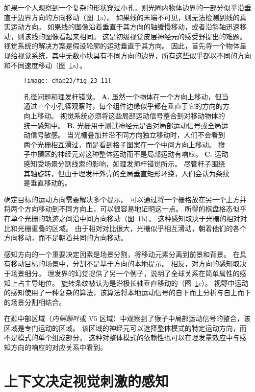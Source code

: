 如果一个人观察到一个复杂的形状穿过小孔，则光圈内物体边界的一部分似乎沿垂直于边界方向的方向移动（图~\ref{fig:23_11}a）。 
如果线的末端不可见，则无法检测到线的真实运动方向。 
如果线的图像沿着垂直于其方向的轴缓慢移动，或者沿斜轴迅速移动，则该线的图像看起来相同。
这是初级视觉皮层神经元的感受野提出的难题。 
视觉系统的解决方案是假设轮廓的运动垂直于其方向。 
因此，首先将一个物体呈现给视觉系统，其中无数小块具有不同方向的边界，所有这些似乎都以不同的方向和不同速度移动（图~\ref{fig:23_11}a）。


\begin{figure}[htbp]
	\centering
	\texttt{[image: chap23/fig\_23\_11]}
	\caption{孔径问题和理发杆错觉。
		\textbf{A.} 虽然一个物体在一个方向上移动，但当通过一个小孔径观察时，每个组件边缘似乎都在垂直于它的方向的方向上移动。
		视觉系统必须将这些局部运动信号整合到对移动物体的统一感知中。
		\textbf{B.} 光栅用于测试神经元是否对局部运动信号或全局运动信号敏感。
		当光栅叠加并沿不同方向独立移动时，人们不会看到两个光栅相互滑过，而是看到格子图案在一个中间方向上移动。
		猴子中颞区的神经元对这种整体运动而不是局部运动有响应。
		\textbf{C.} 运动感知受场景分割线索的影响，如理发师杆错觉所示。
		尽管杆子围绕其轴旋转，但由于理发杆外壳的全局垂直矩形环绕，人们会认为条纹是垂直移动的。}
	\label{fig:23_11}
\end{figure}


确定目标的运动方向需要解决多个提示。
可以通过将一个栅格放在另一个上方并将两个方向移动到不同方向上，可以很容易地证明这一点。
所得的棋盘格态似乎在单个光栅的轨迹之间沿中间方向移动（图~\ref{fig:23_11}b）。
这种感知取决于光栅的相对对比和光栅重叠的区域。
由于相对对比很大，光栅似乎相互滑动，朝着他们的各个方向移动，而不是朝着共同的方向移动。


感知方向的一个重要决定因素是场景分割，将移动元素分离到前景和背景。
在具有移动目标的场景中，分割不是基于方向的本地提示。
相反，对方向的感知取决于场景细分。
理发界的幻觉提供了另一个例子，说明了全球关系在简单属性的感知上占主导地位。
旋转条纹被认为是沿极长轴垂直移动的（图~\ref{fig:23_11}c）。
视野中运动的感知使用了一种复杂的算法，该算法将本地运动信号的自下而上分析与自上而下的场景分割相结合。


在颞中部区域（\textit{内侧颞叶}或 V5 区域）中观察到了猴子中局部运动信号的整合，该区域是专门运动的区域。
该区域的神经元可以选择整体模式的特定运动方向，而不是模式的单个组成部分。
这种对整体模式的依赖性也可以在理发量效应中与感知方向的响应的对应关系中看到。



\section{上下文决定视觉刺激的感知}

